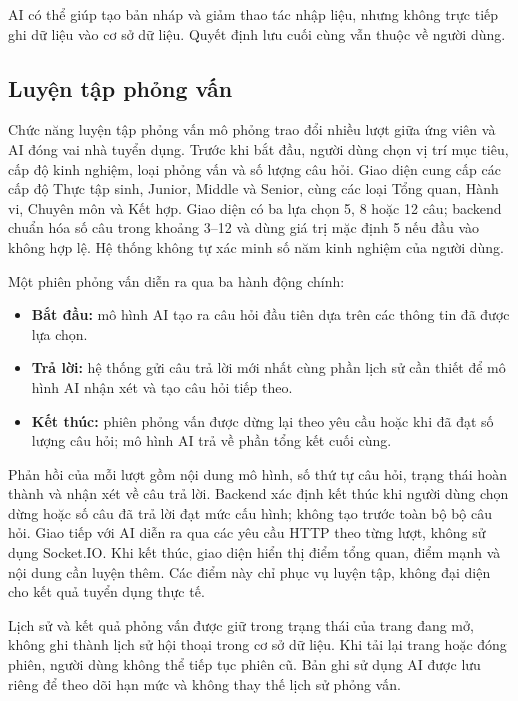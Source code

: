 AI có thể giúp tạo bản nháp và giảm thao tác nhập liệu, nhưng không trực tiếp ghi dữ liệu vào cơ sở dữ liệu. Quyết định lưu cuối cùng vẫn thuộc về người dùng.

\subsection{Luyện tập phỏng vấn}

Chức năng luyện tập phỏng vấn mô phỏng trao đổi nhiều lượt giữa ứng viên và AI đóng vai nhà tuyển dụng. Trước khi bắt đầu, người dùng chọn vị trí mục tiêu, cấp độ kinh nghiệm, loại phỏng vấn và số lượng câu hỏi. Giao diện cung cấp các cấp độ Thực tập sinh, Junior, Middle và Senior, cùng các loại Tổng quan, Hành vi, Chuyên môn và Kết hợp. Giao diện có ba lựa chọn 5, 8 hoặc 12 câu; backend chuẩn hóa số câu trong khoảng 3--12 và dùng giá trị mặc định 5 nếu đầu vào không hợp lệ. Hệ thống không tự xác minh số năm kinh nghiệm của người dùng.

Một phiên phỏng vấn diễn ra qua ba hành động chính:

\begin{itemize}
    \item \textbf{Bắt đầu:} mô hình AI tạo ra câu hỏi đầu tiên dựa trên các thông tin đã được lựa chọn.
    \item \textbf{Trả lời:} hệ thống gửi câu trả lời mới nhất cùng phần lịch sử cần thiết để mô hình AI nhận xét và tạo câu hỏi tiếp theo.
    \item \textbf{Kết thúc:} phiên phỏng vấn được dừng lại theo yêu cầu hoặc khi đã đạt số lượng câu hỏi; mô hình AI trả về phần tổng kết cuối cùng.
\end{itemize}

Phản hồi của mỗi lượt gồm nội dung mô hình, số thứ tự câu hỏi, trạng thái hoàn thành và nhận xét về câu trả lời. Backend xác định kết thúc khi người dùng chọn dừng hoặc số câu đã trả lời đạt mức cấu hình; không tạo trước toàn bộ bộ câu hỏi. Giao tiếp với AI diễn ra qua các yêu cầu HTTP theo từng lượt, không sử dụng Socket.IO. Khi kết thúc, giao diện hiển thị điểm tổng quan, điểm mạnh và nội dung cần luyện thêm. Các điểm này chỉ phục vụ luyện tập, không đại diện cho kết quả tuyển dụng thực tế.

Lịch sử và kết quả phỏng vấn được giữ trong trạng thái của trang đang mở, không ghi thành lịch sử hội thoại trong cơ sở dữ liệu. Khi tải lại trang hoặc đóng phiên, người dùng không thể tiếp tục phiên cũ. Bản ghi sử dụng AI được lưu riêng để theo dõi hạn mức và không thay thế lịch sử phỏng vấn.

